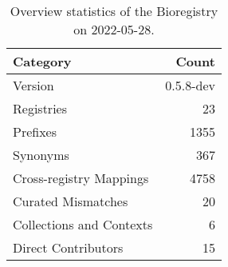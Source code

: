 \begin{table}
\centering
\caption{Overview statistics of the Bioregistry on 2022-05-28.}
\label{tab:bioregistry-summary}
\begin{tabular}{lr}
\toprule
                Category &     Count \\
\midrule
                 Version & 0.5.8-dev \\
              Registries &        23 \\
                Prefixes &      1355 \\
                Synonyms &       367 \\
 Cross-registry Mappings &      4758 \\
      Curated Mismatches &        20 \\
Collections and Contexts &         6 \\
     Direct Contributors &        15 \\
\bottomrule
\end{tabular}
\end{table}
